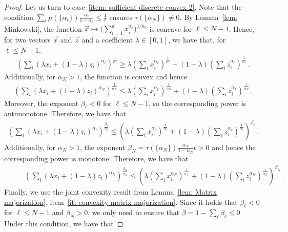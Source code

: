\documentclass[aps,pra,11pt,onecolumn,nofootinbib,tightenlines]{revtex4-2}
\theoremstyle{definition}
\begin{document}
\begin{proof}
 Let us turn to case~\ref{item: sufficient discrete convex 2}. 
 Note that the condition $\sum_\ell\mu(\{\alpha_\ell\}) \frac{\alpha_\ell}{1-\alpha_\ell} \leq \frac{1}{t}$ ensures $\tau(\{\alpha_N\}) \neq 0$.
By Lemma~\ref{lem: Minkowski}, the function $\vec{x} \mapsto \big(\sum_{i=1}^d x_i^{\alpha_\ell}\big)^{1/\alpha_\ell}$ is concave for $\ell\leq N-1$. Hence, for two vectors $\vec{x}$ and $\vec{z}$ and a coefficient $\lambda \in [0,1]$, we have that, for $\ell\leq N-1$,
\begin{align}
    \left(\sum_{i} (\lambda x_i+(1-\lambda)z_i)^{\alpha_\ell}\right)^\frac{1}{\alpha_\ell} \geq \lambda \left(\sum_{i} x_i^{\alpha_\ell}\right)^\frac{1}{\alpha_\ell} + (1-\lambda) \left(\sum_{i}  z_i^{\alpha_\ell}\right)^\frac{1}{\alpha_\ell} \,.
\end{align}
Additionally, for $\alpha_N > 1$, the function is convex and hence
\begin{align}
    \left(\sum_{i} (\lambda x_i+(1-\lambda)z_i)^{\alpha_N}\right)^{\frac{1}{\alpha_N}} \leq \lambda \left(\sum_{i} x_i^{\alpha_k}\right)^{\frac{1}{\alpha_N}} + (1-\lambda) \left(\sum_{i}  z_i^{\alpha_k}\right)^{\frac{1}{\alpha_N}} \,.
\end{align}
Moreover, the exponent $\beta_\ell < 0$ for $\ell\leq N-1$, so the corresponding power is antimonotone. Therefore, we have that
\begin{align}
    \left(\sum_{i} (\lambda x_i+(1-\lambda)z_i)^{\alpha_\ell}\right)^{\frac{\beta_\ell}{\alpha_\ell}} \leq \left(\lambda \left(\sum_{i} x_i^{\alpha_\ell}\right)^\frac{1}{\alpha_\ell} + (1-\lambda) \left(\sum_{i}  z_i^{\alpha_\ell}\right)^\frac{1}{\alpha_\ell}\right)^{\beta_\ell} \,.
\end{align}
Additionally, for $\alpha_N > 1$, the exponent $\beta_N = \tau(\{\alpha_N\}) \frac{\alpha_N}{1-\alpha_N}t > 0$ and hence the corresponding power is monotone. Therefore, we have that
\begin{align}
   \qquad \;\, \left(\sum_{i} (\lambda x_i+(1-\lambda)z_i)^{\alpha_N}\right)^\frac{\beta_N}{\alpha_N} \leq \left(\lambda \left(\sum_{i} x_i^{\alpha_N}\right)^\frac{1}{\alpha_N} + (1-\lambda) \left(\sum_{i}  z_i^{\alpha_N}\right)^\frac{1}{\alpha_N}\right)^{\beta_N} \,.
\end{align}
Finally, we use the joint convexity result from Lemma~\ref{lem: Matrix majorization}, item~\ref{it: convexity matrix majorization}. Since it holds that $\beta_\ell <0$ for $\ell\leq N-1$ and $\beta_N >0$, we only need to ensure that $ \bar{\beta}= 1- \sum_\ell\beta_\ell \leq 0$.  Under this condition, we have that

\end{proof}
\end{document}
